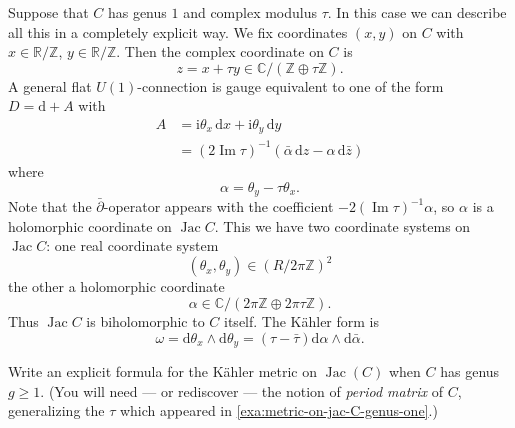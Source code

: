 \documentclass[12pt,letterpaper,reqno]{article}
\numberwithin{equation}{section}
\newcommand{\R}{\ensuremath{\mathbb R}}
\newcommand{\C}{\ensuremath{\mathbb C}}
\newcommand{\Z}{\ensuremath{\mathbb Z}}
\newcommand{\kahler}{K\"ahler\xspace}
\newcommand{\I}{{\mathrm i}}
\newcommand{\de}{\mathrm{d}}
\newcommand{\ti}[1]{\textit{#1}}
\DeclareMathOperator{\im}{Im}
\DeclareMathOperator{\Jac}{Jac}
\begin{document}
\begin{example} \label{exa:metric-on-jac-C-genus-one}
Suppose that $C$ has genus $1$ and complex modulus $\tau$.
In this case we can describe all this in a completely explicit way.
We fix coordinates $(x,y)$ on $C$ with $x \in \R/\Z$, $y \in \R/\Z$.
Then the complex coordinate on $C$ is
\begin{equation}
  z = x + \tau y \in \C / (\Z \oplus \tau \Z).
\end{equation}
A general flat $U(1)$-connection
is gauge equivalent to one of the form $D = \de + A$ with
\begin{align}
  A &= \I \theta_x \, \de x + \I \theta_y \, \de y \\
  &= (2 \im \tau)^{-1} (\bar\alpha \, \de z - \alpha \, \de \bar{z})
\end{align}
where
\begin{equation}
  \alpha = \theta_y - \tau \theta_x.
\end{equation}
Note that the $\bar\partial$-operator appears with
the coefficient $-2 (\im \tau)^{-1} \alpha$,
so $\alpha$ is a holomorphic coordinate on $\Jac C$.  
This we have two coordinate systems on $\Jac C$: one
real coordinate system
\begin{equation}
(\theta_x, \theta_y) \in (R / 2\pi\Z)^2
\end{equation}
the other a holomorphic coordinate
\begin{equation}
\alpha \in \C / \left( 2\pi \Z \oplus  2\pi \tau \Z\right).
\end{equation}
Thus $\Jac C$ is biholomorphic to $C$ itself.
The \kahler form is
\begin{equation}
  \omega = \de \theta_x \wedge \de \theta_y = (\tau - \bar\tau) \de \alpha \wedge \de \bar\alpha.
\end{equation}
\end{example}

\begin{exercise}
Write an explicit formula for the \kahler metric on $\Jac(C)$
when $C$ has genus $g \ge 1$. (You will need --- or rediscover ---
the notion of \ti{period matrix} of $C$, generalizing the $\tau$
which appeared in \autoref{exa:metric-on-jac-C-genus-one}.)
\end{exercise}
\end{document}
